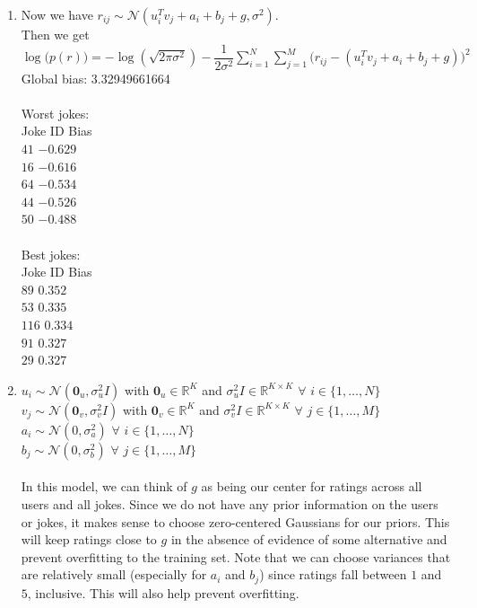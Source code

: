 \documentclass[10pt]{harvardml}
\newcommand{\R}{\mathbb{R}}
\newcommand{\N}{\mathcal{N}}
\theoremstyle{plain}
\begin{document}
\begin{enumerate}[label=\alph*.]
\item Now we have $r_{ij}\sim\N(u_i^Tv_j+a_i+b_j+g,\sigma^2)$.\\
Then we get $\log\big(p(r)\big)=-\log(\sqrt{2\pi\sigma^2})-\dfrac{1}{2\sigma^2}\displaystyle\sum_{i=1}^{N}\displaystyle\sum_{j=1}^{M}\big(r_{ij}-(u_i^Tv_j+a_i+b_j+g)\big)^2$\\
Global bias: 3.32949661664\\\\
Worst jokes:\\
Joke ID\hspace{1cm} Bias\\
$41$\hspace{1.5cm} $-0.629$\\
$16$\hspace{1.5cm} $-0.616$\\
$64$\hspace{1.5cm} $-0.534$\\
$44$\hspace{1.5cm} $-0.526$\\
$50$\hspace{1.5cm} $-0.488$\\\\
Best jokes:\\
Joke ID\hspace{1cm} Bias\\
$89$\hspace{1.8cm} $0.352$\\
$53$\hspace{1.8cm} $0.335$\\
$116$\hspace{1.6cm} $0.334$\\
$91$\hspace{1.8cm} $0.327$\\
$29$\hspace{1.8cm} $0.327$\\
\item $u_i\sim\N(\mathbf{0}_u,\sigma_u^2I)$ with $\mathbf{0}_u\in\R^K$ and $\sigma_u^2I\in\R^{K\times K}$ $\forall$ $i\in\{1,\ldots,N\}$\\
$v_j\sim\N(\mathbf{0}_v,\sigma_v^2I)$ with $\mathbf{0}_v\in\R^K$ and $\sigma_v^2I\in\R^{K\times K}$ $\forall$ $j\in\{1,\ldots,M\}$\\
$a_i\sim\N(0,\sigma^2_a)$ $\forall$ $i\in\{1,\ldots,N\}$\\
$b_j\sim\N(0,\sigma^2_b)$ $\forall$ $j\in\{1,\ldots,M\}$\\\\
In this model, we can think of $g$ as being our center for ratings across all users and all jokes. Since we do not have any prior information on the users or jokes, it makes sense to choose zero-centered Gaussians for our priors. This will keep ratings close to $g$ in the absence of evidence of some alternative and prevent overfitting to the training set. Note that we can choose variances that are relatively small (especially for $a_i$ and $b_j$) since ratings fall between $1$ and $5$, inclusive. This will also help prevent overfitting.

\end{enumerate}
\end{document}
